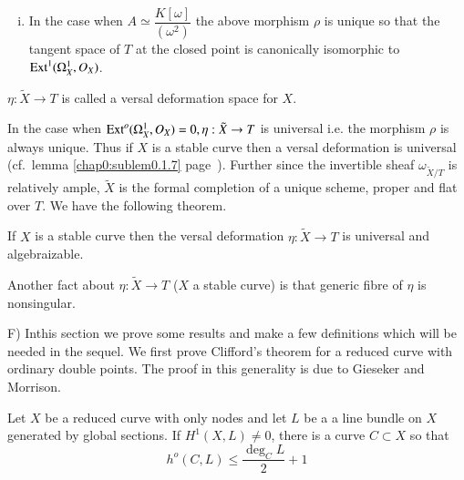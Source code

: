 {\begin{subtheorem}
\begin{enumerate}[i)]
\item In the case when  $ A \simeq \dfrac{K[\omega]}{(\omega^2)}$  the
  above morphism  $\rho $ is unique so that the tangent space of $T$
  at the  closed point is canonically isomorphic to $ \operatorname{Ext}^1
  (\Omega^1_{X}, O_X)$. 
\end{enumerate}

$\eta : \tilde{X} \rightarrow  T $ is called a versal deformation
space for $X$. 
\end{subtheorem}

In the case when  $ \operatorname{Ext}^o (\Omega^1_{X}, O_X) = 0, \eta : \tilde{X}
\rightarrow T $  is universal i.e. the morphism  $\rho $  is always
unique. Thus if $X$ is a stable  curve then a versal deformation is
universal (cf.~lemma \ref{chap0:sublem0.1.7}
page~\pageref{page14}).  Further since the 
invertible sheaf  $\omega_{\tilde{X}/T}$  is  relatively ample,
$\tilde{X}$ is the  formal completion of a unique scheme, proper and
flat over $T$. We have the following theorem. 


\begin{subtheorem}\label{chap0:subthm0.2.2}%
 If $X$  is a stable  curve then the versal deformation $ \eta :
 \tilde{X} \rightarrow T $   is universal and algebraizable. 
\end{subtheorem} 

Another fact about $ \eta : \tilde{X} \rightarrow T$ ($X$ a stable
curve) is that generic fibre of $\eta$ is nonsingular. 

\medskip
\noindent
F) \qquad 
In\pageoriginale this section we prove some results and  make a few definitions
which will be needed in the  sequel. We first prove Clifford's theorem
for  a reduced curve with ordinary double  points. The proof in this
generality is  due to Gieseker and  Morrison. 

\begin{subtheorem}\label{chap0:subthm0.2.3} %
 Let  $X$ be a reduced curve with only nodes
and let $L$ be a a line  bundle on $X$ generated by global
sections. If $H^1 (X,L) \neq 0$, there is a curve $C \subset X$ so
that  
$$
h^o (C,L) \leq \frac{\deg_C L}{2} + 1
$$
\end{subtheorem} 

}
